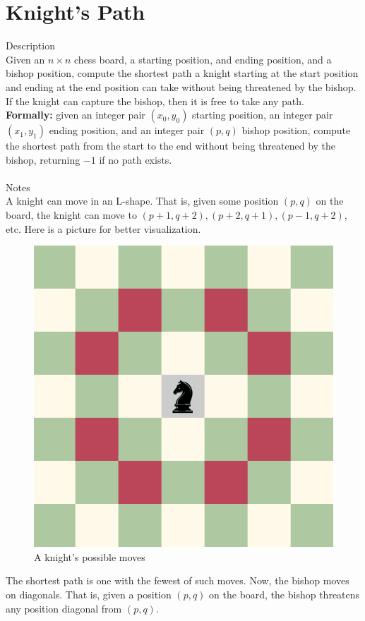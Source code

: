 \documentclass[11pt]{exam}
\begin{document}
\section*{Knight's Path}

{\large Description}\\
Given an $n\times n$ chess board, a starting position, and ending position,
and a bishop position, compute the shortest path a knight starting at the
start position and ending at the end position can take without being
threatened by the bishop. If the knight can capture the bishop, then
it is free to take any path.\\
\textbf{Formally:} given an integer pair $(x_0,y_0)$ starting position, an integer pair $(x_1, y_1)$ ending position, and an integer pair $(p, q)$ bishop position, compute the shortest path from the start to the end without being threatened by the bishop, returning $-1$ if no path exists.\\\\
{\large Notes}\\
A knight can move in an L-shape. That is, given some position $(p,q)$ on
the board, the knight can move to $(p+1,q+2), (p+2,q+1), (p-1,q+2)$, etc.
Here is a picture for better visualization.
\begin{figure}[H]
	\centering
	\includegraphics[width=0.7\linewidth]{knight_moves.png}
	\caption{A knight's possible moves}
\end{figure}
The shortest path is one with the fewest of such moves. Now, the bishop moves on diagonals. That is, given a position $(p,q)$ on the board, the bishop threatens any position diagonal from $(p, q)$.
\end{document}
